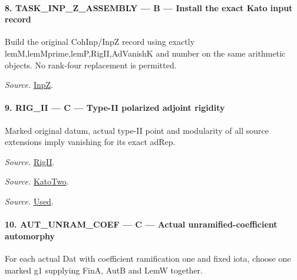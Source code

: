 \documentclass[11pt,a4paper]{article}
\numberwithin{equation}{section}
\theoremstyle{remark}\newtheorem{remark}[theorem]{Remark}
\begin{document}
\paragraph{8. TASK\_\allowbreak INP\_\allowbreak Z\_\allowbreak ASSEMBLY — B — Install the exact Kato input record}

Build the original CohInp/InpZ record using exactly lemM,lemMprime,lemP,RigII,AdVanishK and number on the same arithmetic objects. No rank-four replacement is permitted.

\emph{Source.} \href{https://github.com/CocoSgt/riemann-hypothesis-lean/blob/7cbf7a0c32fca1badf05931879a37c3f8a2b03b4/src/Development/AutomorphicArithmetic/AutomorphicVarieties/ModularityArgument/KatoQuadraticCharacters/KatoTwoOfUseN.lean#L55-L61}{InpZ}.



\paragraph{9. RIG\_\allowbreak II — C — Type-II polarized adjoint rigidity}

Marked original datum, actual type-II point and modularity of all source extensions imply vanishing for its exact adRep.

\emph{Source.} \href{https://github.com/CocoSgt/riemann-hypothesis-lean/blob/7cbf7a0c32fca1badf05931879a37c3f8a2b03b4/src/Development/AutomorphicArithmetic/AutomorphicVarieties/ModularityArgument/KatoQuadraticCharacters/KatoTwoOfUseN.lean#L49-L53}{RigII}.

\emph{Source.} \href{https://github.com/CocoSgt/riemann-hypothesis-lean/blob/7cbf7a0c32fca1badf05931879a37c3f8a2b03b4/src/Development/AutomorphicArithmetic/AutomorphicVarieties/ModularityArgument/KatoQuadraticCharacters/KatoTwoOfUseN.lean#L43-L47}{KatoTwo}.

\emph{Source.} \href{https://github.com/CocoSgt/riemann-hypothesis-lean/blob/7cbf7a0c32fca1badf05931879a37c3f8a2b03b4/src/Development/AutomorphicArithmetic/AutomorphicVarieties/ModularityArgument/KatoQuadraticCharacters/KatoTwoOfUseN.lean#L11-L41}{Used}.



\paragraph{10. AUT\_\allowbreak UNRAM\_\allowbreak COEF — C — Actual unramified-coefficient automorphy}

For each actual Dat with coefficient ramification one and fixed iota, choose one marked g1 supplying FinA, AutB and LemW together.
\end{document}
